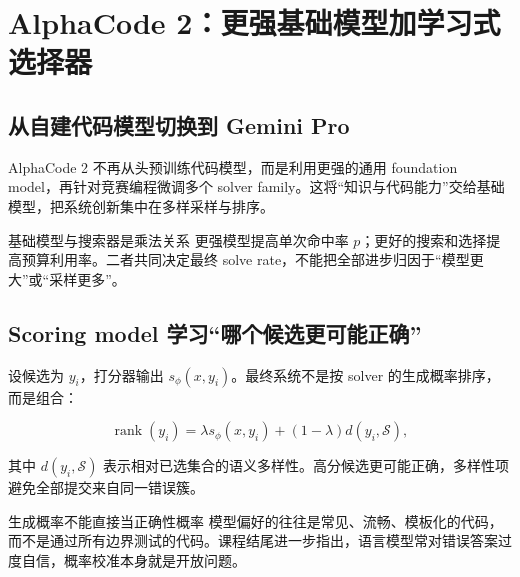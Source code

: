 \section{AlphaCode 2：更强基础模型加学习式选择器}

\subsection{从自建代码模型切换到 Gemini Pro}


AlphaCode 2 不再从头预训练代码模型，而是利用更强的通用 foundation model，再针对竞赛编程微调多个 solver family。这将“知识与代码能力”交给基础模型，把系统创新集中在多样采样与排序。


\begin{importantbox}{基础模型与搜索器是乘法关系}
更强模型提高单次命中率 $p$；更好的搜索和选择提高预算利用率。二者共同决定最终 solve rate，不能把全部进步归因于“模型更大”或“采样更多”。
\end{importantbox}

\subsection{Scoring model 学习“哪个候选更可能正确”}


设候选为 $y_i$，打分器输出 $s_\phi(x,y_i)$。最终系统不是按 solver 的生成概率排序，而是组合：

$$
\operatorname{rank}(y_i)=
\lambda s_\phi(x,y_i)+(1-\lambda)d(y_i,\mathcal S),
$$

其中 $d(y_i,\mathcal S)$ 表示相对已选集合的语义多样性。高分候选更可能正确，多样性项避免全部提交来自同一错误簇。

\begin{warningbox}{生成概率不能直接当正确性概率}
模型偏好的往往是常见、流畅、模板化的代码，而不是通过所有边界测试的代码。课程结尾进一步指出，语言模型常对错误答案过度自信，概率校准本身就是开放问题。
\end{warningbox}

